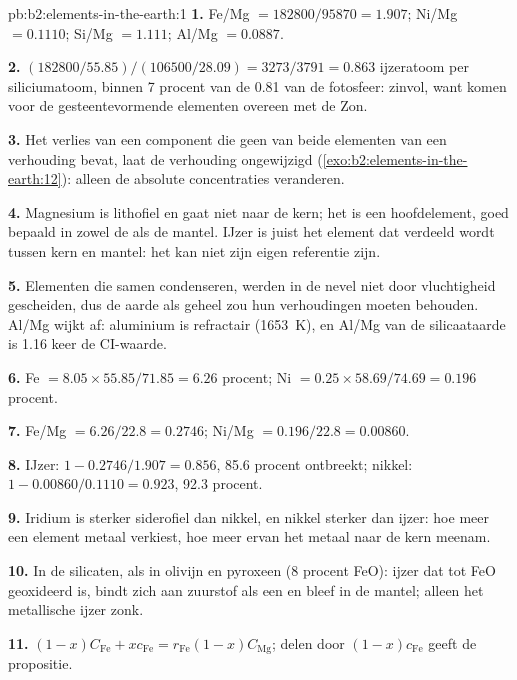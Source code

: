 \begin{solution}{pb:b2:elements-in-the-earth:1}
\textbf{1.} Fe/Mg $= \num{182800}/\num{95870} = 1.907$; Ni/Mg $= 0.1110$; Si/Mg $=
1.111$; Al/Mg $= 0.0887$.

\textbf{2.} $(\num{182800}/55.85)/(\num{106500}/28.09) = 3273/3791 = 0.863$ ijzeratoom per
siliciumatoom, binnen 7 procent van de 0.81 van de fotosfeer: zinvol, want 
komen voor de gesteentevormende elementen overeen met de Zon.

\textbf{3.} Het verlies van een component die geen van beide elementen van een verhouding bevat, laat de
verhouding ongewijzigd (\cref{exo:b2:elements-in-the-earth:12}): alleen de absolute concentraties veranderen.

\textbf{4.} Magnesium is lithofiel en gaat niet naar de kern; het is een hoofdelement,
goed bepaald in zowel de  als de mantel. IJzer is juist het element dat verdeeld wordt
tussen kern en mantel: het kan niet zijn eigen referentie zijn.

\textbf{5.} Elementen die samen condenseren, werden in de nevel niet door vluchtigheid
gescheiden, dus de aarde als geheel zou hun verhoudingen moeten behouden. Al/Mg wijkt af: aluminium is
refractair (\qty{1653}{K}), en Al/Mg van de silicaataarde is 1.16 keer de CI-waarde.

\textbf{6.} Fe $= 8.05\times55.85/71.85 = 6.26$ procent; Ni $= 0.25\times58.69/74.69 =
0.196$ procent.

\textbf{7.} Fe/Mg $= 6.26/22.8 = 0.2746$; Ni/Mg $= 0.196/22.8 = 0.00860$.

\textbf{8.} IJzer: $1 - 0.2746/1.907 = 0.856$, 85.6 procent ontbreekt; nikkel:
$1 - 0.00860/0.1110 = 0.923$, 92.3 procent.

\textbf{9.} Iridium is sterker siderofiel dan nikkel, en nikkel sterker dan ijzer:
hoe meer een element metaal verkiest, hoe meer ervan het metaal naar de kern meenam.

\textbf{10.} In de silicaten, als  in olivijn en pyroxeen (8 procent FeO):
ijzer dat tot FeO geoxideerd is, bindt zich aan zuurstof als een  en bleef in de
mantel; alleen het metallische ijzer zonk.

\textbf{11.} $(1-x)C_{\mathrm{Fe}} + xc_{\mathrm{Fe}} = r_{\mathrm{Fe}}(1-x)C_{\mathrm{Mg}}$;
delen door $(1-x)c_{\mathrm{Fe}}$ geeft de propositie.


\end{solution}
